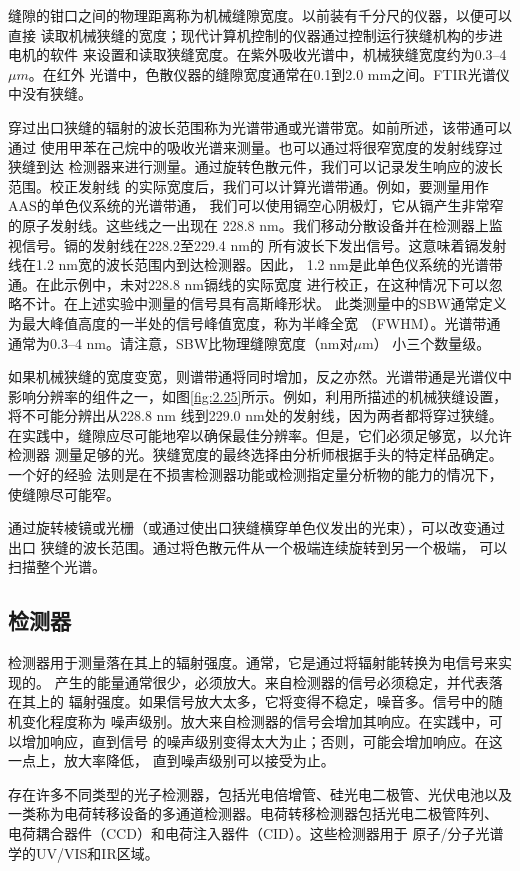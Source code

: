 缝隙的钳口之间的物理距离称为机械缝隙宽度。以前装有千分尺的仪器，以便可以直接
读取机械狭缝的宽度；现代计算机控制的仪器通过控制运行狭缝机构的步进电机的软件
来设置和读取狭缝宽度。在紫外吸收光谱中，机械狭缝宽度约为0.3--4 $\mu m$。在红外
光谱中，色散仪器的缝隙宽度通常在0.1到2.0 mm之间。FTIR光谱仪中没有狭缝。

穿过出口狭缝的辐射的波长范围称为光谱带通或光谱带宽。如前所述，该带通可以通过
使用甲苯在己烷中的吸收光谱来测量。也可以通过将很窄宽度的发射线穿过狭缝到达
检测器来进行测量。通过旋转色散元件，我们可以记录发生响应的波长范围。校正发射线
的实际宽度后，我们可以计算光谱带通。例如，要测量用作AAS的单色仪系统的光谱带通，
我们可以使用镉空心阴极灯，它从镉产生非常窄的原子发射线。这些线之一出现在
228.8 nm。我们移动分散设备并在检测器上监视信号。镉的发射线在228.2至229.4 nm的
所有波长下发出信号。这意味着镉发射线在1.2 nm宽的波长范围内到达检测器。因此，
1.2 nm是此单色仪系统的光谱带通。在此示例中，未对228.8 nm镉线的实际宽度
进行校正，在这种情况下可以忽略不计。在上述实验中测量的信号具有高斯峰形状。
此类测量中的SBW通常定义为最大峰值高度的一半处的信号峰值宽度，称为半峰全宽
（FWHM）。光谱带通通常为0.3--4 nm。请注意，SBW比物理缝隙宽度（nm对$\mu$m）
小三个数量级。

如果机械狭缝的宽度变宽，则谱带通将同时增加，反之亦然。光谱带通是光谱仪中
影响分辨率的组件之一，如图\ref{fig:2.25}所示。例如，利用所描述的机械狭缝设置，
将不可能分辨出从228.8 nm 线到229.0 nm处的发射线，因为两者都将穿过狭缝。
在实践中，缝隙应尽可能地窄以确保最佳分辨率。但是，它们必须足够宽，以允许检测器
测量足够的光。狭缝宽度的最终选择由分析师根据手头的特定样品确定。一个好的经验
法则是在不损害检测器功能或检测指定量分析物的能力的情况下，使缝隙尽可能窄。

通过旋转棱镜或光栅（或通过使出口狭缝横穿单色仪发出的光束），可以改变通过出口
狭缝的波长范围。通过将色散元件从一个极端连续旋转到另一个极端，
可以扫描整个光谱。
\subsection{检测器}
检测器用于测量落在其上的辐射强度。通常，它是通过将辐射能转换为电信号来实现的。
产生的能量通常很少，必须放大。来自检测器的信号必须稳定，并代表落在其上的
辐射强度。如果信号放大太多，它将变得不稳定，噪音多。信号中的随机变化程度称为
噪声级别。放大来自检测器的信号会增加其响应。在实践中，可以增加响应，直到信号
的噪声级别变得太大为止；否则，可能会增加响应。在这一点上，放大率降低，
直到噪声级别可以接受为止。

存在许多不同类型的光子检测器，包括光电倍增管、硅光电二极管、光伏电池以及
一类称为电荷转移设备的多通道检测器。电荷转移检测器包括光电二极管阵列、
电荷耦合器件（CCD）和电荷注入器件（CID）。这些检测器用于
原子/分子光谱学的UV/VIS和IR区域。

